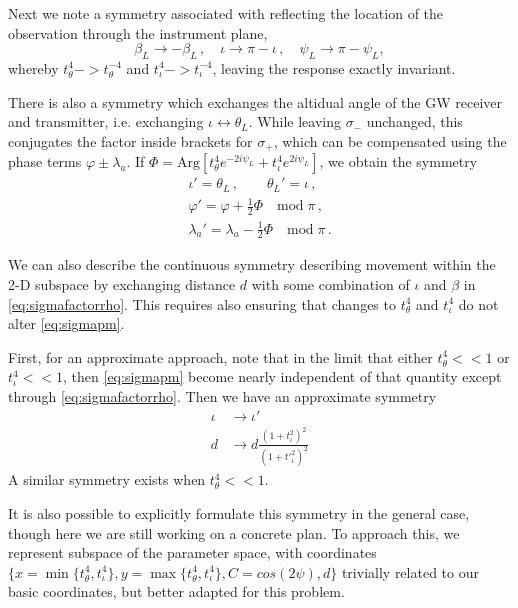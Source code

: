 \documentclass[aps,showpacs,twocolumn,prd,superscriptaddress,nofootinbib]{revtex4}
\newcommand{\be}{\begin{equation}}
\newcommand{\ee}{\end{equation}}
\newcommand{\nn}{\nonumber}
\newcommand\betaL{{\beta_{L}}}
\newcommand\psiL{{\psi_{L}}}
\begin{document}
Next we note a symmetry associated with reflecting the location of the observation through the instrument plane, 
\be\label{eq:symmetryresponse}
\betaL \rightarrow -\betaL\,, \quad \iota \rightarrow \pi - \iota \,, \quad \psiL \rightarrow \pi - \psiL,
\ee
whereby  $t^4_{\theta}->t^{-4}_{\theta}$ and $t^4_{\iota}->t^{-4}_{\iota}$,
leaving the response exactly invariant.

There is also a symmetry which exchanges the altidual angle of the GW receiver and transmitter, i.e. exchanging $\iota \leftrightarrow \theta_{L}$. While leaving $\sigma_-$ unchanged, this conjugates the factor inside brackets for $\sigma_{+}$, which can be compensated using the phase terms $\varphi \pm \lambda_{a}$. If $\Phi = \mathrm{Arg} \left[ t_{\theta}^{4} e^{-2 i \psiL} + t_{\iota}^{4} e^{2 i \psiL} \right]$, we obtain the symmetry
\begin{align}
	\iota' = \theta_{L} \,, \qquad \theta_{L}' = \iota \,, \nn\\
	\varphi' = \varphi + \frac{1}{2} \Phi \quad \mathrm{mod} \; \pi\,, \nn\\
	\lambda_{a}' = \lambda_{a} - \frac{1}{2} \Phi \quad \mathrm{mod} \; \pi\,.
\end{align}

We can also describe the continuous symmetry describing movement within the 2-D subspace by exchanging distance $d$ with some combination of $\iota$ and $\beta$ in  \eqref{eq:sigmafactorrho}.  This requires also ensuring that changes to $t^4_{\theta}$ and $t^4_{\iota}$ do not alter \eqref{eq:sigmapm}.

First, for an approximate approach, note that in the limit that either $t^4_\theta<<1$ or $t^4_\iota<<1$, then \eqref{eq:sigmapm} become nearly independent of that quantity except through  \eqref{eq:sigmafactorrho}. Then we have an approximate symmetry
\begin{align}
  \iota&\rightarrow\iota'\\
  d&\rightarrow d\frac{(1+t^2_{\iota})^2}{(1+t'^2_{\iota})^2}
\end{align}
A similar symmetry exists when $t^4_\theta<<1$.

It is also possible to explicitly formulate this symmetry in the general case, though here we are still working on a concrete plan.
To approach this, we represent subspace of the parameter space, with coordinates $\{x=\min\{t^4_\theta,t^4_\iota\},y=\max\{t^4_\theta,t^4_\iota\},C=cos(2\psi),d\}$ trivially related to our basic coordinates, but better adapted for this problem.
\end{document}
